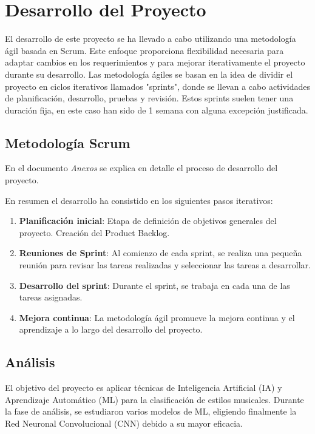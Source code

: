 
\section{Desarrollo del Proyecto}

El desarrollo de este proyecto se ha llevado a cabo utilizando una metodología ágil basada en Scrum. Este enfoque proporciona flexibilidad necesaria para adaptar cambios en los requerimientos y para mejorar iterativamente el proyecto durante su desarrollo.
Las metodología ágiles se basan en la idea de dividir el proyecto en ciclos iterativos llamados "sprints", donde se llevan a cabo actividades de planificación, desarrollo, pruebas y revisión. 
Estos sprints suelen tener una duración fija, en este caso han sido de 1 semana con alguna excepción justificada.

\subsection{Metodología Scrum}
En el documento \textit{Anexos} se explica en detalle el proceso de desarrollo del proyecto.

En resumen el desarrollo ha consistido en los siguientes pasos iterativos:

\begin{enumerate}
\item \textbf{Planificación inicial}: Etapa de definición de objetivos generales del proyecto. Creación del Product Backlog.

\item \textbf{Reuniones de Sprint}: Al comienzo de cada sprint, se realiza una pequeña reunión para revisar las tareas realizadas y seleccionar las tareas a desarrollar.

\item \textbf{Desarrollo del sprint}: Durante el sprint, se trabaja en cada una de las tareas asignadas.

\item \textbf{Mejora continua}: La metodología ágil promueve la mejora continua y el aprendizaje a lo largo del desarrollo del proyecto.
\end{enumerate}

\subsection{Análisis}

El objetivo del proyecto es aplicar técnicas de Inteligencia Artificial (IA) y Aprendizaje Automático (ML) para la clasificación de estilos musicales. 
Durante la fase de análisis, se estudiaron varios modelos de ML, eligiendo finalmente la Red Neuronal Convolucional (CNN) debido a su mayor eficacia.

